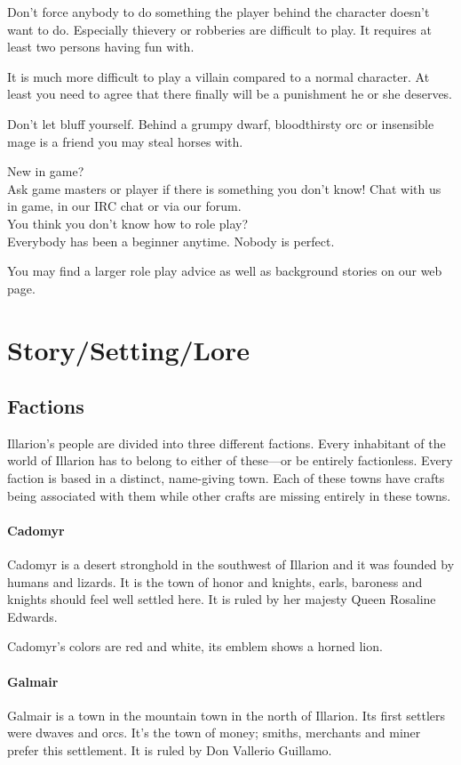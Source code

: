 \documentclass[a4paper,11pt]{scrreprt}
\begin{document}
Don't force anybody to do something the player behind the character doesn't want to do. Especially thievery or robberies are difficult to play. It requires at least two persons having 
fun with. 

It is much more difficult to play a villain compared to a normal character. At least you need to 
agree that there finally will be a punishment he or she deserves. 

Don't let bluff yourself. Behind a grumpy dwarf, bloodthirsty orc or insensible mage is a friend 
you may steal horses with. 

New in game? \\
Ask game masters or player if there is something you don't know!
Chat with us in game, in our IRC chat or via our forum. 
\\

You think you don't know how to role play? \\
Everybody has been a beginner anytime. 
Nobody is perfect. 

You may find a larger role play advice as well as background stories on our web page. 

\section{Story/Setting/Lore}
\subsection{Factions}
Illarion's people are divided into three different factions. Every inhabitant of the world of Illarion has to belong to either of these---or be entirely factionless. Every faction is based in a distinct, name-giving town. Each of these towns have crafts being associated with them while other crafts are missing entirely in these towns.
\paragraph{Cadomyr}
Cadomyr is a desert stronghold in the southwest of Illarion and it was founded by humans and lizards. It is the town of honor and knights, earls, baroness and knights should feel 
well settled here. It is ruled by her majesty Queen Rosaline Edwards.

Cadomyr's colors are red and white, its emblem shows a horned lion. 

\paragraph{Galmair}
Galmair is a town in the mountain town in the north of Illarion. Its first settlers were dwaves and 
orcs. It's the town of money; smiths, merchants and miner prefer this settlement. It is ruled by Don Vallerio 
Guillamo.
\end{document}

